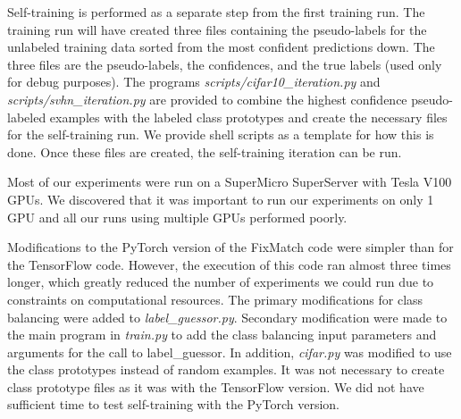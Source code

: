 \documentclass[final]{cvpr}
\begin{document}
Self-training is performed as a separate step from the first training run.
The training run will have created three files containing the pseudo-labels for the unlabeled training data sorted from the most confident predictions down. 
The three files are the pseudo-labels, the confidences, and the true labels (used only for debug purposes).
The programs \emph{scripts/cifar10\_iteration.py} and \emph{scripts/svhn\_iteration.py} are provided to combine the highest confidence pseudo-labeled examples with the labeled class prototypes and create the necessary files for the self-training run.
We provide shell scripts as a template for how this is done.
Once these files are created, the self-training iteration can be run.

Most of our experiments were run on a SuperMicro SuperServer with Tesla V100 GPUs.
We discovered that it was important to run our experiments on only 1 GPU and all our runs using multiple GPUs performed poorly.


Modifications to the PyTorch version of the FixMatch code were simpler than for the TensorFlow code.
However, the execution of this code ran almost three times longer, which greatly reduced the number of experiments we could run due to constraints on computational resources.
The primary modifications for class balancing were added to \emph{label\_guessor.py}.
Secondary modification were made to the main program in \emph{train.py} to add the class balancing input parameters and arguments for the call to label\_guessor.
In addition, \emph{cifar.py} was modified to use the class prototypes instead of random examples.
It was not necessary to create class prototype files as it was with the TensorFlow version.
We did not have sufficient time to test self-training with the PyTorch version.
\end{document}
